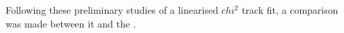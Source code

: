 Following these preliminary studies of a linearised $chi^{2}$ track fit, a comparison was made between it and the \KF.


%
